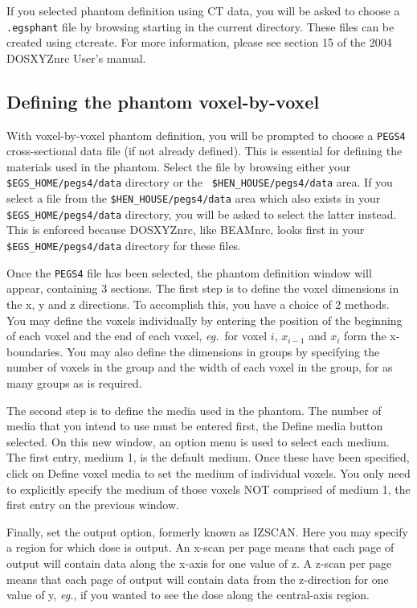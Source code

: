 \documentclass[12pt,twoside]{article}
\newcommand{\eg}{{\em eg.}}
\begin{document}
If you selected phantom definition using CT data, you will be asked to
choose a {\tt .egsphant} file by browsing starting in the current
directory.  These
files can be created using ctcreate.  For more information, please see
section 15 of the 2004 DOSXYZnrc User's manual\cite{WR04a}.

\subsection{Defining the phantom voxel-by-voxel}

With voxel-by-voxel phantom definition, you will be prompted
to choose a {\tt PEGS4} cross-sectional data file (if not already
defined).  This is essential
for defining the materials used in the phantom.  Select the file by
browsing either your {\tt \$EGS\_HOME/pegs4/data} directory or the {\tt
\$HEN\_HOUSE/pegs4/data} area.  If you
select a file from the {\tt \$HEN\_HOUSE/pegs4/data} area which also
exists in your {\tt \$EGS\_HOME/pegs4/data}
directory, you will be asked to select the latter instead.  This is
enforced because DOSXYZnrc, like BEAMnrc, looks first in your {\tt
\$EGS\_HOME/pegs4/data} directory for these files.

Once the {\tt PEGS4} file has been selected, the phantom definition
window will appear, containing 3 sections.  The first step is to define
the voxel dimensions in the x, y and z directions.  To accomplish this,
you have a choice of 2 methods.  You may define the voxels individually
by entering the position of the beginning of each voxel and the end of
each voxel, \eg~for voxel $i$, $x_{i-1}$ and $x_i$ form the
x-boundaries.  You may also define the dimensions in groups by
specifying the number of voxels in the group and the width of each voxel
in the group, for as many groups as is required.

The second step is to define the media used in the phantom.  The number
of media that you intend to use must be entered first, the {\sf
Define media} button selected.  On this new window, an option menu is
used to select each medium.  The first entry,
medium 1, is the default medium.  Once these have been specified, click
on {\sf Define voxel media} to set the medium of individual voxels.  You
only need to explicitly specify the medium of those voxels NOT comprised
of medium 1, the first entry on the previous window.

Finally, set the output option, formerly known as IZSCAN.  Here you may
specify a region for which dose is output.  An x-scan per page means
that each page of output will contain data along the x-axis for one
value of z.  A z-scan
per page means that each page of output will contain data from the
z-direction for one value of y, \eg, if you wanted to see the dose along
the central-axis region.
\end{document}
